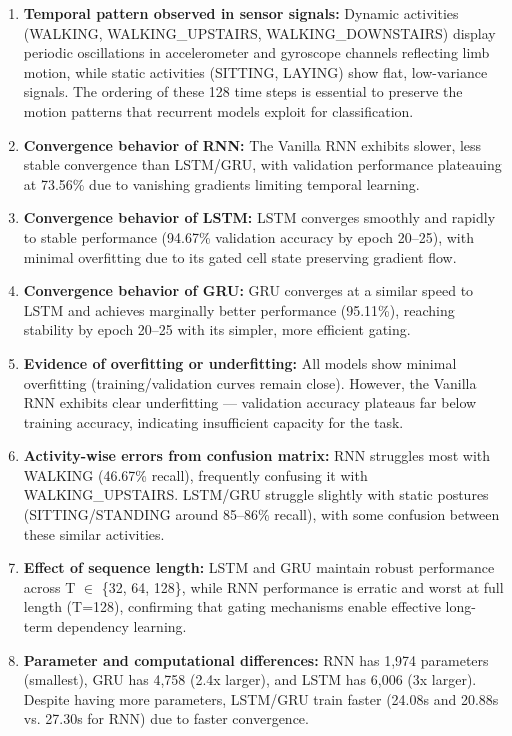 \documentclass[10pt]{article}
\begin{document}
\begin{enumerate}
\item \textbf{Temporal pattern observed in sensor signals:}
Dynamic activities (WALKING, WALKING\_UPSTAIRS, WALKING\_DOWNSTAIRS) display periodic oscillations 
in accelerometer and gyroscope channels reflecting limb motion, while static activities (SITTING, LAYING) 
show flat, low-variance signals. The ordering of these 128 time steps is essential to preserve the motion 
patterns that recurrent models exploit for classification.

\item \textbf{Convergence behavior of RNN:}
The Vanilla RNN exhibits slower, less stable convergence than LSTM/GRU, with validation performance 
plateauing at 73.56\% due to vanishing gradients limiting temporal learning.

\item \textbf{Convergence behavior of LSTM:}
LSTM converges smoothly and rapidly to stable performance (94.67\% validation accuracy by epoch 20--25), 
with minimal overfitting due to its gated cell state preserving gradient flow.

\item \textbf{Convergence behavior of GRU:}
GRU converges at a similar speed to LSTM and achieves marginally better performance (95.11\%), reaching 
stability by epoch 20--25 with its simpler, more efficient gating.

\item \textbf{Evidence of overfitting or underfitting:}
All models show minimal overfitting (training/validation curves remain close). However, the Vanilla RNN 
exhibits clear underfitting — validation accuracy plateaus far below training accuracy, indicating insufficient 
capacity for the task.

\item \textbf{Activity-wise errors from confusion matrix:}
RNN struggles most with WALKING (46.67\% recall), frequently confusing it with WALKING\_UPSTAIRS. 
LSTM/GRU struggle slightly with static postures (SITTING/STANDING around 85--86\% recall), with some 
confusion between these similar activities.

\item \textbf{Effect of sequence length:}
LSTM and GRU maintain robust performance across T $\in$ \{32, 64, 128\}, while RNN performance is 
erratic and worst at full length (T=128), confirming that gating mechanisms enable effective long-term 
dependency learning.

\item \textbf{Parameter and computational differences:}
RNN has 1,974 parameters (smallest), GRU has 4,758 (2.4x larger), and LSTM has 6,006 (3x larger). 
Despite having more parameters, LSTM/GRU train faster (24.08s and 20.88s vs. 27.30s for RNN) due to 
faster convergence.


\end{enumerate}
\end{document}
